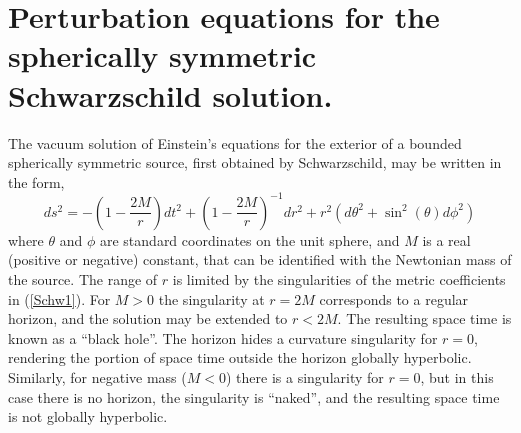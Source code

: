 \documentclass[12pt,aps,floats,showpacs,amssymb,tightenlines]{revtex4}
\begin{document}
\section{Perturbation equations for the spherically symmetric Schwarzschild solution.} \label{rw}

The vacuum solution of Einstein's equations for the exterior of a bounded spherically symmetric source,
first obtained by Schwarzschild, may be written in the form,
\begin{equation}
\label{Schw1}
ds^2 =  -\left(1-\frac{2 M}{r}\right) dt^2 +
 \left(1-\frac{2 M}{r}\right)^{-1} dr^2   +r^2 \left( d \theta^2 +  \sin^2(\theta)
d \phi^2 \right)
\end{equation}
where $\theta$ and $\phi$ are standard coordinates on the unit sphere, and $M$ is a real
(positive or negative) constant, that can be identified with the Newtonian mass of the source.
The range of $r$ is limited by the singularities of the metric coefficients in (\ref{Schw1}).
 For $M>0$ the singularity at $r=2M$ corresponds to a regular horizon, and the solution may be
extended to $r<2M$. The resulting space time is known as a ``black
hole''. The horizon hides
  a curvature singularity for $r=0$, rendering the portion of space time outside the horizon
  globally hyperbolic. Similarly, for negative mass ($M<0$) there is a singularity for $r=0$,
   but in this case there is no horizon, the singularity is ``naked'', and the resulting space
    time is not globally hyperbolic.
\end{document}
